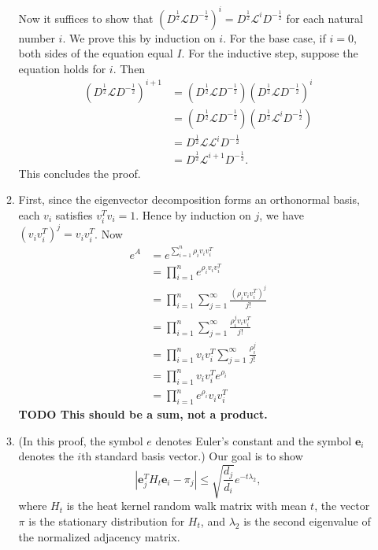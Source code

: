 \documentclass{article}
\newcommand{\todo}[1]{\textbf{TODO #1}}
\newcommand{\1}{\mathbf{1}}
\newcommand{\0}{\mathbf{0}}
\newcommand{\e}{\mathbf{e}}
\renewcommand{\L}{\mathcal{L}}
\begin{document}
\begin{enumerate}
\begin{enumerate}
    Now it suffices to show that $(D^{\frac{1}{2}} \L D^{-\frac{1}{2}})^i = D^{\frac{1}{2}} \L^i D^{-\frac{1}{2}}$ for each natural number $i$.
    We prove this by induction on $i$.
    For the base case, if $i = 0$, both sides of the equation equal $I$.
    For the inductive step, suppose the equation holds for $i$.
    Then
    \begin{align*}
      (D^{\frac{1}{2}} \L D^{-\frac{1}{2}})^{i + 1} & = (D^{\frac{1}{2}} \L D^{-\frac{1}{2}}) (D^{\frac{1}{2}} \L D^{-\frac{1}{2}})^i \\
      & = (D^{\frac{1}{2}} \L D^{-\frac{1}{2}}) (D^{\frac{1}{2}} \L^i D^{-\frac{1}{2}}) \\
      & = D^{\frac{1}{2}} \L \L^i D^{-\frac{1}{2}} \\
      & = D^{\frac{1}{2}} \L^{i + 1} D^{-\frac{1}{2}}.
    \end{align*}
    This concludes the proof.
  \item
    First, since the eigenvector decomposition forms an orthonormal basis, each $v_i$ satisfies $v_i^T v_i = 1$.
    Hence by induction on $j$, we have $(v_i v_i^T)^j = v_i v_i^T$.
    Now
    \begin{align*}
      e^A & = e^{\sum_{i = 1}^n \rho_i v_i v_i^T} \\
      & = \prod_{i = 1}^n e^{\rho_i v_i v_i^T} \\
      & = \prod_{i = 1}^n \sum_{j = 1}^\infty \frac{(\rho_i v_i v_i^T)^j}{j!} \\
      & = \prod_{i = 1}^n \sum_{j = 1}^\infty \frac{\rho_i^j v_i v_i^T}{j!} \\
      & = \prod_{i = 1}^n v_i v_i^T \sum_{j = 1}^\infty \frac{\rho_i^j}{j!} \\
      & = \prod_{i = 1}^n v_i v_i^T e^{\rho_i} \\
      & = \prod_{i = 1}^n e^{\rho_i} v_i v_i^T
    \end{align*}
    \todo{This should be a sum, not a product.}
  \item
    (In this proof, the symbol $e$ denotes Euler's constant and the symbol $\e_i$ denotes the $i$th standard basis vector.)
    Our goal is to show
    \begin{equation*}
      \left|\e_j^T H_t \e_i - \pi_j\right| \leq \sqrt{\frac{d_j}{d_i}} e^{-t \lambda_2},
    \end{equation*}
    where $H_t$ is the heat kernel random walk matrix with mean $t$, the vector $\pi$ is the stationary distribution for $H_t$, and $\lambda_2$ is the second eigenvalue of the normalized adjacency matrix.


\end{enumerate}
\end{enumerate}
\end{document}
